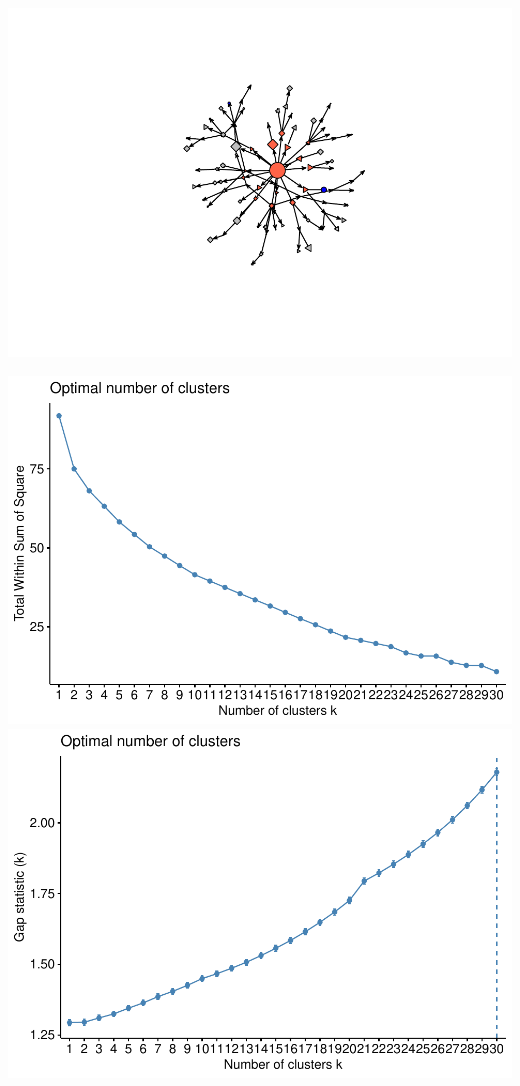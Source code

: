 \documentclass[12pt]{article}
\begin{document}
\includegraphics{JStevenRaquel-paper_files/figure-latex/gplot-size-eigenvector-centrality-1.pdf}

\includegraphics{JStevenRaquel-paper_files/figure-latex/find-best-cluster-number-1.pdf} \includegraphics{JStevenRaquel-paper_files/figure-latex/find-best-cluster-number-2.pdf}
\end{document}
